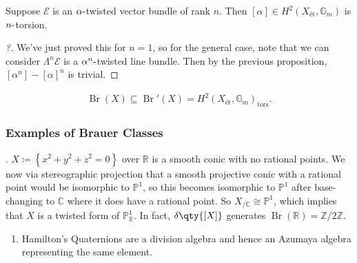 \begin{corollary}[?]

Suppose \(\mathcal{E}\) is an \(\alpha{\hbox{-}}\)twisted vector bundle
of rank \(n\). Then \([\alpha]\in H^{2}(X_{\text{ét}}, {\mathbb{G}}_m)\)
is \(n{\hbox{-}}\)torsion.

\end{corollary}

\begin{proof}[?]

We've just proved this for \(n=1\), so for the general case, note that
we can consider \(\Lambda^{n}\mathcal{E}\) is a
\(\alpha^{n}{\hbox{-}}\)twisted line bundle. Then by the previous
proposition, \([\alpha^{n}] - [\alpha]^{n}\) is trivial.

\end{proof}

\begin{corollary}[?]

\begin{align*}  
\operatorname{Br}(X) \subseteq \operatorname{Br}'(X) = H^{2}(X_{\text{ét}}, {\mathbb{G}}_{m})_{{\operatorname{tors}}}
.\end{align*}

\end{corollary}

\hypertarget{examples-of-brauer-classes}{%
\subsubsection{Examples of Brauer
Classes}\label{examples-of-brauer-classes}}

\begin{example}[?]

. \(X\coloneqq\left\{{ x^{2}+y^{2}+z^{2} = 0}\right\}\) over
\({\mathbb{R}}\) is a smooth conic with no rational points. We now via
stereographic projection that a smooth projective conic with a rational
point would be isomorphic to \({\mathbb{P}}^{1}\), so this becomes
isomorphic to \({\mathbb{P}}^{1}\) after base-changing to
\({\mathbb{C}}\) where it does have a rational point. So
\(X_{/{\mathbb{C}}} \cong {\mathbb{P}}^{1}\), which implies that \(X\)
is a twisted form of \({\mathbb{P}}^{1}_{{\mathbb{R}}}\). In fact,
\(\delta\qty{[X]}\) generates
\(\operatorname{Br}({\mathbb{R}}) = {\mathbb{Z}}/2{\mathbb{Z}}\).

\end{example}

\begin{example}[?]

\begin{enumerate}
\def\labelenumi{\arabic{enumi}.}
\setcounter{enumi}{1}
\tightlist
\item
  Hamilton's Quaternions are a division algebra and hence an Azumaya
  algebra representing the same element.
\end{enumerate}

\end{example}

